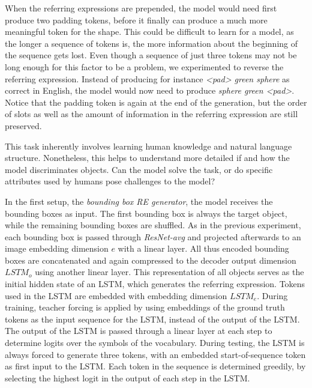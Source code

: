 When the referring expressions are prepended, the model would need first produce two padding tokens, before it finally can produce a much more meaningful token for the shape.
This could be difficult to learn for a model, as the longer a sequence of tokens is, the more information about the beginning of the sequence gets lost.
Even though a sequence of just three tokens may not be long enough for this factor to be a problem, we experimented to reverse the referring expression.
Instead of producing for instance \emph{<pad> green sphere} as correct in English, the model would now need to produce \emph{sphere green <pad>}.
Notice that the padding token is again at the end of the generation, but the order of slots as well as the amount of information in the referring expression are still preserved.

This task inherently involves learning human knowledge and natural language structure.
Nonetheless, this helps to understand more detailed if and how the model discriminates objects.
Can the model solve the task, or do specific attributes used by humans pose challenges to the model?


In the first setup, the \emph{bounding box RE generator}, the model receives the bounding boxes as input.
The first bounding box is always the target object, while the remaining bounding boxes are shuffled.
As in the previous experiment, each bounding box is passed through \emph{ResNet-avg} and projected afterwards to an image embedding dimension $e$ with a linear layer.
All thus encoded bounding boxes are concatenated and again compressed to the decoder output dimension $LSTM_o$ using another linear layer.
This representation of all objects serves as the initial hidden state of an LSTM, which generates the referring expression.
Tokens used in the LSTM are embedded with embedding dimension $LSTM_e$.
During training, teacher forcing is applied by using embeddings of the ground truth tokens as the input sequence for the LSTM, instead of the output of the LSTM.
The output of the LSTM is passed through a linear layer at each step to determine logits over the symbols of the vocabulary.
During testing, the LSTM is always forced to generate three tokens, with an embedded start-of-sequence token as first input to the LSTM.
Each token in the sequence is determined greedily, by selecting the highest logit in the output of each step in the LSTM.

